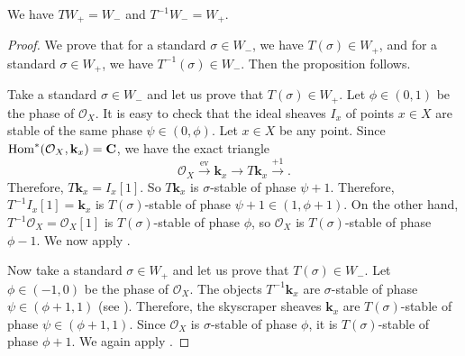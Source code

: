 \documentclass{amsart}
\begin{document}
\begin{proposition}\label{prop:T12}
  We have \(T W_+ = W_{-}\) and \(T^{-1} W_- = W_{+}\).
\end{proposition}
\begin{proof}
  We prove that for a standard \(\sigma \in W_-\), we have \(T(\sigma) \in W_{+}\), and for a standard \(\sigma \in W_{+}\), we have \(T^{-1}(\sigma) \in W_-\).
  Then the proposition follows.
  
  Take a standard \(\sigma \in W_-\)  and let us prove that \(T(\sigma) \in W_{+}\).
  Let \(\phi \in (0,1)\) be the phase of \(\mathcal{O}_X\).
  It is easy to check that the ideal sheaves \(I_x\) of points \(x \in X\) are stable of the same phase \(\psi \in (0,\phi)\).
  Let \(x \in X\) be any point.
  Since \(\operatorname{Hom}^{*}(\mathcal{O}_X, \mathbf{k}_x) = \mathbf{C}\), we have the exact triangle
  \[ \mathcal{O}_X \xrightarrow{\textrm{ev}} \mathbf{k}_x \to T \mathbf{k}_x \xrightarrow{+1}.\]
  Therefore, \( T \mathbf{k}_x = I_x[1]\).
  So \(T \mathbf{k}_x\) is \(\sigma\)-stable of phase \(\psi+1\).
  Therefore, \(T^{-1}I_x [1] = \mathbf{k}_x\) is \(T(\sigma)\)-stable of phase \(\psi + 1 \in (1, \phi+1)\).
  On the other hand, \(T^{-1} \mathcal{O}_X = \mathcal{O}_X[1]\) is \(T(\sigma)\)-stable of phase \(\phi\), so \(\mathcal{O}_X\) is \(T(\sigma)\)-stable of phase \(\phi-1\).
  We now apply .

  Now take a standard \(\sigma \in W_+\)  and let us prove that \(T(\sigma) \in W_{-}\).
  Let \(\phi \in (-1,0)\)  be the phase of \(\mathcal{O}_{X}\).
  The objects \(T^{-1} \mathbf{k}_x\) are \(\sigma\)-stable of phase \(\psi \in (\phi+1,1)\)  (see \cite[Remark~4.3 (i)]{huy.mac.ste:08}).
  Therefore, the skyscraper sheaves \(\mathbf{k}_x\) are \(T(\sigma)\)-stable of phase \(\psi \in (\phi+1,1)\).
  Since \(\mathcal{O}_X\) is \(\sigma\)-stable of phase \(\phi\), it is \(T(\sigma)\)-stable of phase \(\phi+1\).
  We again apply .
\end{proof}
\end{document}
